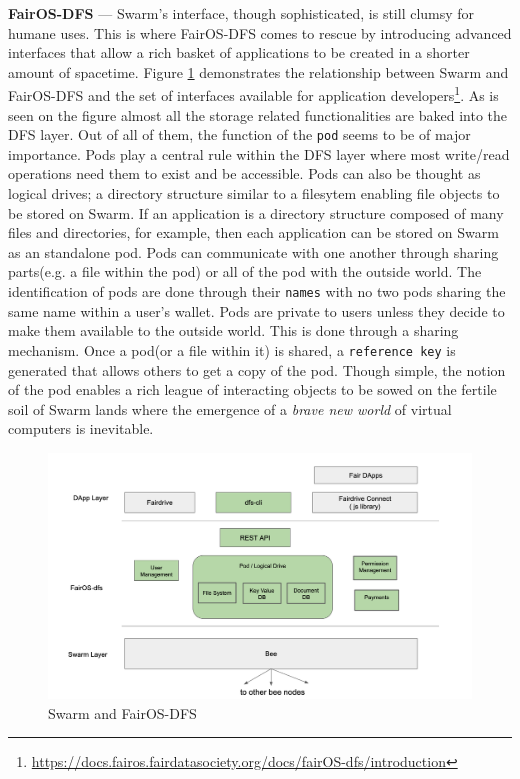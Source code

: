 \documentclass[a4paper, 10pt]{article}
\begin{document}
\par
\textbf{FairOS-DFS} --- Swarm's interface, though sophisticated, is still clumsy for humane uses. This is where FairOS-DFS comes to rescue by introducing advanced interfaces that allow a rich basket of applications to be created in a shorter amount of spacetime. Figure  \ref{swarmfair} demonstrates the relationship between Swarm and FairOS-DFS and the set of interfaces available for application developers\footnote{\url{https://docs.fairos.fairdatasociety.org/docs/fairOS-dfs/introduction}}. As is seen on the figure almost all the storage related functionalities are baked into the DFS layer. Out of all of them, the function of the \texttt{pod} seems to be of major importance. Pods play a central rule within the DFS layer where most write/read operations need them to exist and be accessible. Pods can also be thought as logical drives; a directory structure similar to a filesytem enabling file objects to be stored on Swarm. If an application is a directory structure composed of many files and directories, for example, then each application can be stored on Swarm as an standalone pod. Pods can communicate with one another through sharing parts(e.g. a file within the pod) or all of the pod with the outside world. The identification of pods are done through their \texttt{names} with no two pods sharing the same name within a user's wallet. Pods are private to users unless they decide to make them available to the outside world. This is done through a sharing mechanism. Once a pod(or a file within it) is shared, a \texttt{reference key} is generated that allows others to get a copy of the pod. Though simple, the notion of the pod enables a rich league of interacting objects to be sowed on the fertile soil of Swarm lands where the emergence of a \textit{brave new world} of virtual computers is inevitable.
\begin{figure}
\includegraphics[scale=0.3,keepaspectratio=true]{images/swarm-fair.png}
\caption{\label{swarmfair}Swarm and \textcolor{fairgreen}{FairOS-DFS}}
\end{figure}
\end{document}
